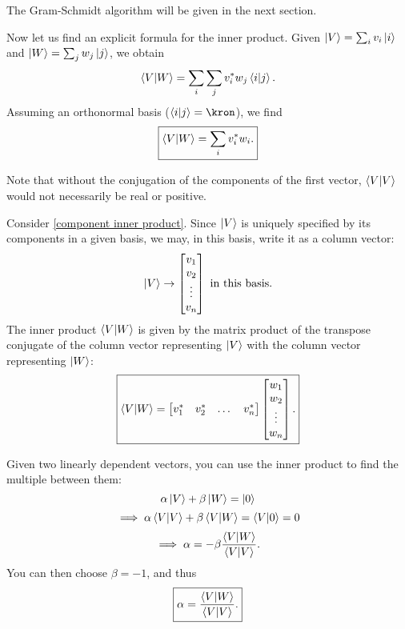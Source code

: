 \begin{remark}
The Gram-Schmidt algorithm will be given in the next section.
\end{remark}

Now let us find an explicit formula for the inner product. Given $\ket{V} = \sum_i v_i \ket{i}$ and $\ket{W} = \sum_j w_j \ket{j}$, we obtain
\begin{equation*}
    \braket{V}{W} = \sum_i \sum_j v_i^* w_j \braket{i}{j}.
\end{equation*}
Assuming an orthonormal basis ($\braket{i}{j} = \kron$), we find
\begin{equation}\label{component inner product}
    \boxed{\braket{V}{W} = \sum_i v_i^* w_i.}
\end{equation}

\begin{remark}
Note that without the conjugation of the components of the first vector, $\braket{V}{V}$ would not necessarily be real or positive.
\end{remark}

Consider \eqref{component inner product}. Since $\ket{V}$ is uniquely specified by its components in a given basis, we may, in this basis, write it as a column vector:
\begin{equation}\label{ket as column}
    \ket{V} \rightarrow
    \begin{bmatrix}
    v_1 \\
    v_2 \\
    \vdots \\
    v_n
    \end{bmatrix}
    \text{ in this basis.}
\end{equation}
The inner product $\braket{V}{W}$ is given by the matrix product of the transpose conjugate of the column vector representing $\ket{V}$ with the column vector representing $\ket{W}$:
\begin{equation}\label{matrix inner product}
\boxed{
    \braket{V}{W} =
    \begin{bmatrix}
    v_1^* & v_2^* & \dots & v_n^*
    \end{bmatrix}
    \begin{bmatrix}
    w_1 \\
    w_2 \\
    \vdots \\
    w_n
    \end{bmatrix}.
}
\end{equation}

\begin{remark}
Given two linearly dependent vectors, you can use the inner product to find the multiple between them:
    $$\alpha\ket{V} + \beta\ket{W} = \ket{0}$$
    $$\implies \alpha\braket{V}{V} + \beta\braket{V}{W} = \braket{V}{0} = 0$$
    $$\implies \alpha = -\beta\frac{\braket{V}{W}}{\braket{V}{V}}.$$
You can then choose $\beta = -1$, and thus
\begin{equation}\label{two vector multiple}
    \boxed{\alpha = \frac{\braket{V}{W}}{\braket{V}{V}}.}
\end{equation}
\end{remark}

